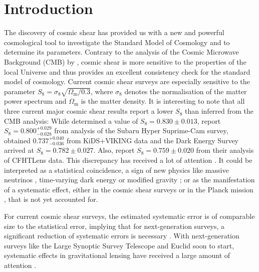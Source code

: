 \documentclass[referee]{aa} %
\renewcommand{\[}{\begin{equation}}
\renewcommand{\]}{\end{equation}}
\renewcommand{\rm}{\mathrm}
\begin{document}

   \maketitle

%
\section{Introduction}
The discovery of cosmic shear has provided us with a new and powerful cosmological tool to investigate the Standard Model of Cosmology and to determine its parameters. Contrary to the analysis of the Cosmic Microwave Background (CMB) by \citet{2018arXiv180706209P}, cosmic shear is more sensitive to the properties of the local Universe and thus provides an excellent consistency check for the standard model of cosmology. Current cosmic shear surveys are especially sensitive to the parameter $S_8=\sigma_8 \sqrt{\Omega_{\rm m}/0.3}$, where $\sigma_8$ denotes the normalisation of the matter power spectrum and $\Omega_{\rm m}$ is the matter density.
It is interesting to note that all three current major cosmic shear results report a lower $S_8$ than inferred from the CMB analysis: While \citet{2018arXiv180706209P} determined a value of $S_8 = 0.830 \pm 0.013$, \citet{2018arXiv180909148H} report $S_8 = 0.800^{+0.029}_{-0.028}$ from analysis of the Subaru Hyper Suprime-Cam survey, \citet[][hereafter H18]{2018arXiv181206076H} obtained $0.737_{-0.036}^{+0.040}$ from KiDS+VIKING data and the Dark Energy Survey \citep{2018PhRvD..98d3528T} arrived at $S_8=0.782\pm 0.027$. Also, \citet{2013MNRAS.432.2433H} report $S_8 = 0.759 \pm 0.020$ from their analysis of CFHTLens data. This discrepancy has received a lot of attention \citep{2017MNRAS.471.1259J,2016MNRAS.459..971K}. It could be interpreted as a statistical coincidence, a sign of new physics like massive neutrinos \citep{2014PhRvL.112e1303B}, time-varying dark energy or modified gravity \citep{2016A&A...594A..14P}; or as the manifestation of a systematic effect, either in the cosmic shear surveys or in the Planck mission \citep{2016ApJ...818..132A}, that is not yet accounted for. 

For current cosmic shear surveys, the estimated systematic error is of comparable size to the statistical error, implying that for next-generation surveys, a significant reduction of systematic errors is necessary \citep[compare][hereafter H17]{2017MNRAS.465.1454H}. With next-generation surveys like the Large Synoptic Survey Telescope and Euclid  soon to start, systematic effects in gravitational lensing have received a large amount of attention \citep{2018arXiv181002353A,2019arXiv190207439B,2019arXiv190109488S}. %
\end{document}

